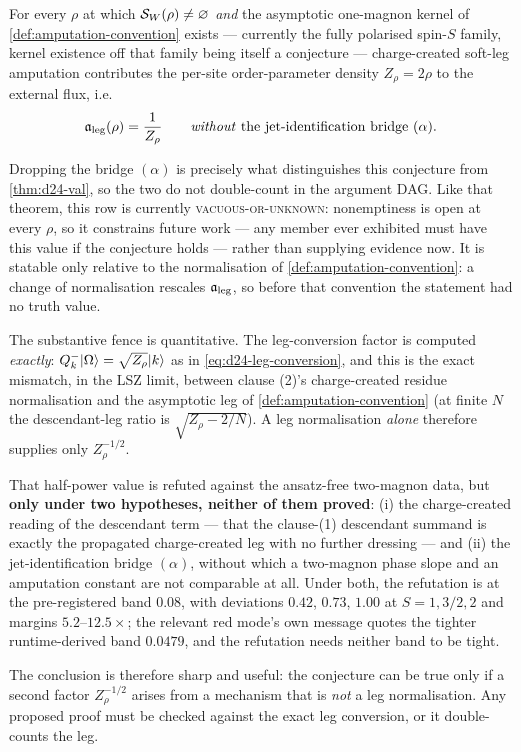 \begin{conjecture}
\label{conj:amp}
\statusConjecture

For every $\rho$ at which $\mathcal{S}_W(\rho)\neq\varnothing$ \emph{and} the
asymptotic one-magnon kernel of \cref{def:amputation-convention} exists ---
currently the fully polarised spin-$S$ family, kernel existence off that
family being itself a conjecture --- charge-created soft-leg amputation
contributes the per-site order-parameter density $Z_\rho=2\rho$ to the
external flux, i.e.
\begin{equation}
  \mathfrak{a}_{\mathrm{leg}}(\rho)=\frac{1}{Z_\rho}
  \qquad\text{\emph{without} the jet-identification bridge }(\alpha).
  \label{eq:amp}
\end{equation}
\end{conjecture}

\begin{scope}
\label{scope:amp}
Dropping the bridge $(\alpha)$ is precisely what distinguishes this conjecture
from \cref{thm:d24-val}, so the two do not double-count in the argument DAG.
Like that theorem, this row is currently \textsc{vacuous-or-unknown}:
nonemptiness is open at every $\rho$, so it constrains future work --- any
member ever exhibited must have this value if the conjecture holds --- rather
than supplying evidence now. It is statable only relative to the normalisation
of \cref{def:amputation-convention}: a change of normalisation rescales
$\mathfrak{a}_{\mathrm{leg}}$, so before that convention the statement had no truth value.

The substantive fence is quantitative. The leg-conversion factor is computed
\emph{exactly}: $Q^-_k|\Omega\rangle=\sqrt{Z_\rho}|k\rangle$ as in
\cref{eq:d24-leg-conversion}, and this is the exact mismatch, in the LSZ limit,
between clause (2)'s charge-created residue normalisation and the asymptotic
leg of \cref{def:amputation-convention} (at finite $N$ the descendant-leg
ratio is $\sqrt{Z_\rho-2/N}$). A leg normalisation \emph{alone} therefore
supplies only $Z_\rho^{-1/2}$.

That half-power value is refuted against the ansatz-free two-magnon data, but
\textbf{only under two hypotheses, neither of them proved}: (i) the
charge-created reading of the descendant term --- that the clause-(1)
descendant summand is exactly the propagated charge-created leg with no
further dressing --- and (ii) the jet-identification bridge $(\alpha)$, without
which a two-magnon phase slope and an amputation constant are not comparable
at all. Under both, the refutation is at the pre-registered band $0.08$, with
deviations $0.42$, $0.73$, $1.00$ at $S=1,3/2,2$ and margins $5.2$--$12.5\times$;
the relevant red mode's own message quotes the tighter runtime-derived band
$0.0479$, and the refutation needs neither band to be tight.

The conclusion is therefore sharp and useful: the conjecture can be true only
if a second factor $Z_\rho^{-1/2}$ arises from a mechanism that is \emph{not}
a leg normalisation. Any proposed proof must be checked against the exact leg
conversion, or it double-counts the leg.
\end{scope}

